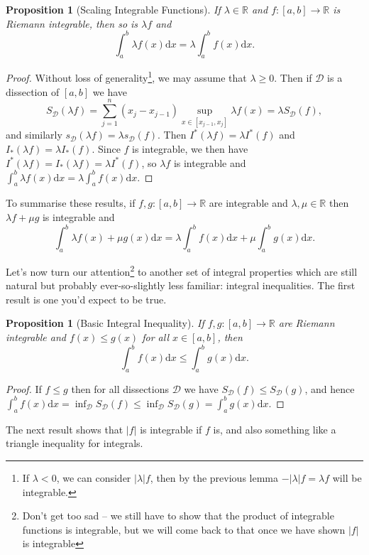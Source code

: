 \documentclass[11pt, a4paper]{article}
\newtheorem{proposition}[theorem]{Proposition}
\theoremstyle{definition}
\newcommand{\R}{\mathbb{R}}
\newcommand{\DD}{\mathcal{D}}
\newcommand{\dd}{\mathrm{d}}
\begin{document}
\begin{proposition}[Scaling Integrable Functions]
	If $\lambda \in \R$ and $f:[a, b] \rightarrow \R$ is Riemann integrable, then so is $\lambda f$ and 
	$$\int_a^b \lambda f(x) \dd x = \lambda \int_a^b f(x) \dd x.$$
\end{proposition}
\begin{proof}
	Without loss of generality\footnote{If $\lambda < 0$, we can consider $|\lambda| f$, then by the previous lemma $-|\lambda| f = \lambda f$ will be integrable.}, we may assume that $\lambda \geq 0$. Then if $\DD$ is a dissection of $[a, b]$ we have
	$$
	S_{\DD}(\lambda f) = \sum_{j = 1}^n (x_j - x_{j - 1})\sup_{x \in [x_{j - 1}, x_j]} \lambda f(x) = \lambda S_\DD(f),
	$$
	and similarly $s_{\DD}(\lambda f) = \lambda s_{\DD}(f)$. Then $I^*(\lambda f) = \lambda I^*(f)$ and $I_*(\lambda f) = \lambda I_*(f)$. Since $f$ is integrable, we then have $I^*(\lambda f) = I_*(\lambda f) = \lambda I^*(f)$, so $\lambda f$ is integrable and $\int_a^b \lambda f(x) \dd x = \lambda \int_a^b f(x) \dd x$.
\end{proof}

To summarise these results, if $f, g:[a, b] \rightarrow \R$ are integrable and $\lambda, \mu \in \R$ then $\lambda f + \mu g$ is integrable and
$$
	\int_a^b \lambda f(x) + \mu g(x) \dd x = \lambda \int_a^b f(x) \dd x + \mu \int_a^b g(x) \dd x.
$$

Let's now turn our attention\footnote{Don't get too sad -- we still have to show that the product of integrable functions is integrable, but we will come back to that once we have shown $|f|$ is integrable} to another set of integral properties which are still natural but probably ever-so-slightly less familiar: integral inequalities. The first result is one you'd expect to be true.

\begin{proposition}[Basic Integral Inequality]
	If $f, g:[a, b] \rightarrow \R$ are Riemann integrable and $f(x) \leq g(x)$ for all $x \in [a, b]$, then
	$$
	\int_a^b f(x) \dd x \leq \int_a^b g(x) \dd x.
	$$
\end{proposition}
\begin{proof}
	If $f \leq g$ then for all dissections $\DD$ we have $S_{\DD}(f) \leq S_{\DD}(g)$, and hence
	$
	\int_a^b f(x) \dd x = \inf_{\DD} S_{\DD}(f) \leq \inf_{\DD} S_{\DD}(g) = \int_{a}^b g(x) \dd x
	$.
\end{proof}

The next result shows that $|f|$ is integrable if $f$ is, and also 
something like a triangle inequality for integrals.
\end{document}
